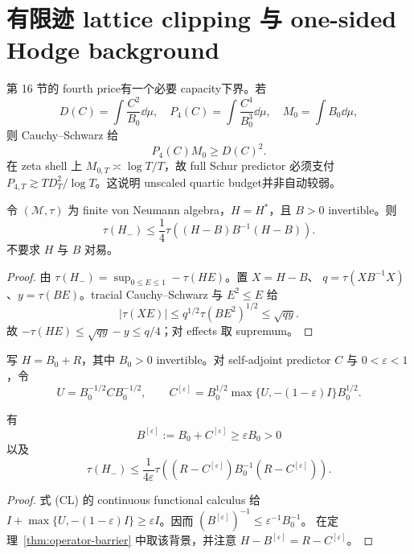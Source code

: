 \section{有限迹 lattice clipping 与 one-sided Hodge background}

第 16 节的 fourth price有一个必要 capacity下界。若
\[
 D(C)=\int\frac{C^2}{B_0}\dd\mu,\quad
 P_4(C)=\int\frac{C^4}{B_0^3}\dd\mu,\quad
 M_0=\int B_0\dd\mu ,
\]
则 Cauchy--Schwarz 给
\[
 P_4(C)M_0\geq D(C)^2.                            \tag{QC}
\]
在 zeta shell 上 $M_{0,T}\asymp\log T/T$，故 full Schur predictor 必须支付
$P_{4,T}\gtrsim TD_T^2/\log T$。这说明 unscaled quartic budget并非自动较弱。

\begin{theorem}
\label{thm:operator-barrier}
令 $(\mathcal M,\tau)$ 为 finite von Neumann algebra，$H=H^*$，且 $B>0$
invertible。则
\[
 \tau(H_-)\leq\frac14\tau\!\left((H-B)B^{-1}(H-B)\right). \tag{OB}
\]
不要求 $H$ 与 $B$ 对易。
\end{theorem}

\begin{proof}
由 $\tau(H_-)=\sup_{0\leq E\leq1}-\tau(HE)$。置 $X=H-B$、
$q=\tau(XB^{-1}X)$、$y=\tau(BE)$。tracial Cauchy--Schwarz 与
$E^2\leq E$ 给
\[
 |\tau(XE)|\leq q^{1/2}\tau(BE^2)^{1/2}\leq\sqrt{qy}.
\]
故 $-\tau(HE)\leq\sqrt{qy}-y\leq q/4$；对 effects 取 supremum。
\end{proof}

写 $H=B_0+R$，其中 $B_0>0$ invertible。对 self-adjoint predictor $C$ 与
$0<\varepsilon<1$，令
\[
 U=B_0^{-1/2}CB_0^{-1/2},\qquad
 C^{[\varepsilon]}=
 B_0^{1/2}\max\{U,-(1-\varepsilon)I\}B_0^{1/2}. \tag{CL}
\]

\begin{theorem}
\label{thm:lattice-clip}
有
\[
 B^{[\varepsilon]}:=B_0+C^{[\varepsilon]}
 \geq\varepsilon B_0>0
\]
以及
\[
 \tau(H_-)\leq\frac{1}{4\varepsilon}
 \tau\!\left((R-C^{[\varepsilon]})B_0^{-1}
                 (R-C^{[\varepsilon]})\right).   \tag{CR}
\]
\end{theorem}

\begin{proof}
式 (CL) 的 continuous functional calculus 给
$I+\max\{U,-(1-\varepsilon)I\}\geq\varepsilon I$。因而
$(B^{[\varepsilon]})^{-1}\leq\varepsilon^{-1}B_0^{-1}$。
在定理~\ref{thm:operator-barrier} 中取该背景，并注意
$H-B^{[\varepsilon]}=R-C^{[\varepsilon]}$。
\end{proof}

